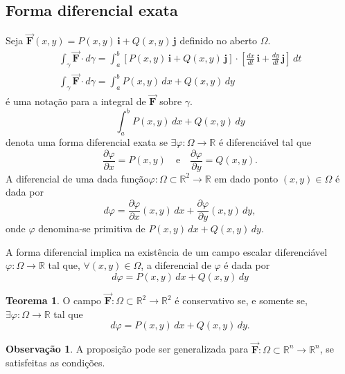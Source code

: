 \documentclass[11pt]{article}
\theoremstyle{definition}
\newtheorem{obs}{Observação}
\newtheorem{teorema}{Teorema}
\begin{document}
	\subsection{Forma diferencial exata}
	
	Seja $\vec{\boldsymbol{F}}(x,y)=P(x,y)\,\mathbf{i}+Q(x,y)\,\mathbf{j}$ definido no aberto $\Omega$.
	\begin{gather*}
		\int_{\gamma}\vec{\boldsymbol{F}}\cdot d\gamma=\int_{a}^{b}[P(x,y)\,\mathbf{i}+Q(x,y)\,\mathbf{j}]\cdot \left[\frac{dx}{dt}\,\mathbf{i}+\frac{dy}{dt}\,\mathbf{j}\right]\, dt\\
		\int_{\gamma}\vec{\boldsymbol{F}}\cdot d\gamma=\int_{a}^{b}P(x,y)\,dx+Q(x,y)\,dy
	\end{gather*}
	é uma notação para a integral de $\vec{\boldsymbol{F}}$ sobre $\gamma$.
	\begin{equation*}
		\int_{a}^{b}P(x,y)\,dx+Q(x,y)\,dy
	\end{equation*}
	denota uma forma diferencial exata se $\exists\varphi:\Omega\to \mathbb{R}$ é diferenciável tal que
	\begin{equation*}
		\frac{\partial \varphi}{\partial x}=P(x,y)\quad \text{e}\quad \frac{\partial \varphi}{\partial y}=Q(x,y).
	\end{equation*}
	A diferencial de uma dada função$\varphi:\Omega\subset \mathbb{R}^2\to \mathbb{R}$ em dado ponto $(x,y)\in \Omega$ é dada por
	\begin{equation*}
		d\varphi=\frac{\partial \varphi}{\partial x}(x,y)\, dx+\frac{\partial \varphi}{\partial y}(x,y)\, dy,
	\end{equation*}
	onde $\varphi$ denomina-se primitiva de $P(x,y)\,dx+Q(x,y)\,dy$.
	
	A forma diferencial implica na existência de um campo escalar diferenciável $\varphi:\Omega\to \mathbb{R}$ tal que, $\forall(x,y)\in \Omega$, a diferencial de $\varphi$ é dada por
	\begin{equation}
		d\varphi=P(x,y)\,dx+Q(x,y)\,dy
	\end{equation}
	\begin{teorema}
		O campo $\vec{\boldsymbol{F}}:\Omega\subset \mathbb{R}^2\to \mathbb{R}^2$ é conservativo se, e somente se, $\exists\varphi:\Omega \to \mathbb{R}$ tal que
		\begin{equation*}
			d\varphi=P(x,y)\,dx+Q(x,y)\,dy.
		\end{equation*}
	\end{teorema}
	\begin{obs}
		A proposição pode ser generalizada para $\vec{\boldsymbol{F}}:\Omega\subset \mathbb{R}^n\to \mathbb{R}^n$, se satisfeitas as condições.
	\end{obs}
\end{document}
